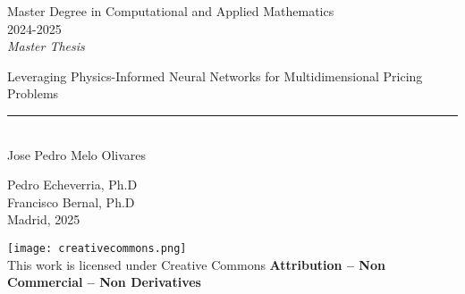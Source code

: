 \documentclass[12pt]{report} %
\theoremstyle{plain}           %
\theoremstyle{definition}      %
\theoremstyle{remark}          %
\begin{document}
	
\begin{titlepage}
	\begin{sffamily}
	\color{azulUC3M}
	\begin{center}
		\begin{figure}[H] %
		\end{figure}
		\vspace{2.5cm}
		\begin{Large}
			Master Degree in Computational and Applied Mathematics\\			
			 2024-2025\\ %
			\vspace{2cm}		
			\textsl{Master Thesis}
			\bigskip
			
		\end{Large}
		 	{\Huge Leveraging Physics-Informed Neural Networks for Multidimensional Pricing Problems}\\
		 	\vspace*{0.5cm}
	 		\rule{10.5cm}{0.1mm}\\
			\vspace*{0.9cm}
			{\LARGE Jose Pedro Melo Olivares}\\ 
			\vspace*{1cm}
		\begin{Large}
			Pedro Echeverria, Ph.D \\
			Francisco Bernal, Ph.D\\
			Madrid, 2025\\
		\end{Large}
	\end{center}
	\vfill
	\color{black}

	\noindent\texttt{[image: creativecommons.png]}\\ %
    \footnotesize{This work is licensed under Creative Commons \textbf{Attribution – Non Commercial – Non Derivatives}}
	
	\end{sffamily}
\end{titlepage}
\end{document}
